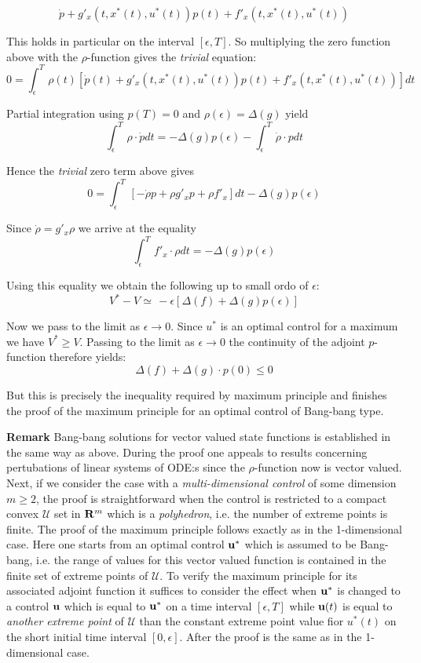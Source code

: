 \documentclass{amsart}
\begin{document}
\[
\dot p+g'_x(t,x^*(t),u^*(t))p(t)+f'_x(t,x^*(t),u^*(t))
\]
\medskip


\noindent
This holds in particular  on the interval $[\epsilon,T]$. So
multiplying the zero function above with
the $\rho$-function gives the \emph{trivial} equation:
\[
0=\int_\epsilon^T\,\rho(t)[\dot p(t)+g'_x(t,x^*(t),u^*(t))p(t)+f'_x(t,x^*(t),u^*(t))]dt
\]
\medskip

\noindent
Partial integration using $p(T)=0$  and $\rho(\epsilon)=\Delta(g)$ yield
\[
\int_\epsilon^T\,\rho\cdot\dot  pdt=-\Delta(g)p(\epsilon)
-\int_\epsilon^T\,\dot\rho\cdot pdt
\]
\medskip

\noindent Hence the \emph{trivial} zero term above gives
\[
0=\int_\epsilon^T\,[ -\dot\rho p  +\rho g'_x p+\rho f'_x]dt
-\Delta(g)p(\epsilon)
\]
\medskip

\noindent
Since $\dot\rho=g'_x\rho$ we arrive at the equality
\[
\int_\epsilon^T\,f'_x\cdot\rho dt=
-\Delta(g)p(\epsilon)
\]
\medskip

\noindent
Using this equality we obtain the following up to small ordo of $\epsilon$:
\[
V^*-V\simeq\, -\epsilon[\Delta(f)+\Delta(g)p(\epsilon)]
\]
\medskip

\noindent
Now we pass to the limit as $\epsilon\to 0$. 
Since $u^*$ is an optimal control for a maximum
we have $V^*\geq V$. Passing to the limit as $\epsilon\to 0$
the continuity of the adjoint $p$-function therefore yields:
\[
\Delta(f)+\Delta(g)\cdot p(0)\leq 0
\]
\medskip  

\noindent But this is precisely the 
inequality required by maximum principle and
finishes the
proof of the maximum principle for an optimal control of
Bang-bang type.





\newpage

\noindent
{\bf Remark} Bang-bang solutions for
vector valued state functions is established  in the same
way  as above.
During the proof one appeals to
results concerning pertubations of linear systems of 
ODE:s since  the $\rho$-function now is vector valued.
Next, if we consider the case with a \emph{multi-dimensional
control} of some dimension $m\geq 2$, the
proof is  straightforward when
the control is restricted to a compact convex
$\mathcal U$  set in
$\bold R^m$  which is a \emph{polyhedron}, i.e. the
number of extreme points is finite.
The proof of the maximum principle
follows exactly as in the 1-dimensional case.
Here one
starts from an optimal control
$\bold u^*$ which is 
assumed to be Bang-bang, i.e. the range of values for
this vector valued function is contained in the finite set of
extreme points of $\mathcal U$.
To verify the maximum principle for its associated adjoint 
function it suffices to consider the effect when $\bold u^*$
is changed to a control $\bold u$ which is equal to $\bold u^*$
on a time interval $[\epsilon,T]$ while $\bold u(t)$  is equal to 
\emph{another extreme point} of $\mathcal U$ than the 
constant extreme point
value fior $u^*(t)$ on the short initial time interval $[0,\epsilon]$. After
the proof is the same as in the 1-dimensional case.
\end{document}
